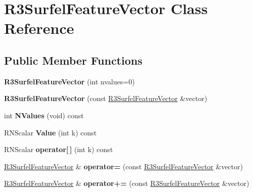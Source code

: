\hypertarget{class_r3_surfel_feature_vector}{}\section{R3\+Surfel\+Feature\+Vector Class Reference}
\label{class_r3_surfel_feature_vector}
\subsection*{Public Member Functions}
\begin{DoxyCompactItemize}
\item 
{\bfseries R3\+Surfel\+Feature\+Vector} (int nvalues=0)\hypertarget{class_r3_surfel_feature_vector_aee3b6c306e9c9bbbb0ce590dffea5a0a}{}\label{class_r3_surfel_feature_vector_aee3b6c306e9c9bbbb0ce590dffea5a0a}

\item 
{\bfseries R3\+Surfel\+Feature\+Vector} (const \hyperlink{class_r3_surfel_feature_vector}{R3\+Surfel\+Feature\+Vector} \&vector)\hypertarget{class_r3_surfel_feature_vector_a18ea0c4805eafdf629959736dc810789}{}\label{class_r3_surfel_feature_vector_a18ea0c4805eafdf629959736dc810789}

\item 
int {\bfseries N\+Values} (void) const \hypertarget{class_r3_surfel_feature_vector_a790ba6798718202f0a2ef0420c05708f}{}\label{class_r3_surfel_feature_vector_a790ba6798718202f0a2ef0420c05708f}

\item 
R\+N\+Scalar {\bfseries Value} (int k) const \hypertarget{class_r3_surfel_feature_vector_ad369ddb0340023a479f69a82266b9f01}{}\label{class_r3_surfel_feature_vector_ad369ddb0340023a479f69a82266b9f01}

\item 
R\+N\+Scalar {\bfseries operator\mbox{[}$\,$\mbox{]}} (int k) const \hypertarget{class_r3_surfel_feature_vector_afeca7dc25cbfa427483b28cba537bc25}{}\label{class_r3_surfel_feature_vector_afeca7dc25cbfa427483b28cba537bc25}

\item 
\hyperlink{class_r3_surfel_feature_vector}{R3\+Surfel\+Feature\+Vector} \& {\bfseries operator=} (const \hyperlink{class_r3_surfel_feature_vector}{R3\+Surfel\+Feature\+Vector} \&vector)\hypertarget{class_r3_surfel_feature_vector_a747f16ad4203e39deaf6149a2f2a6843}{}\label{class_r3_surfel_feature_vector_a747f16ad4203e39deaf6149a2f2a6843}

\item 
\hyperlink{class_r3_surfel_feature_vector}{R3\+Surfel\+Feature\+Vector} \& {\bfseries operator+=} (const \hyperlink{class_r3_surfel_feature_vector}{R3\+Surfel\+Feature\+Vector} \&vector)\hypertarget{class_r3_surfel_feature_vector_ab3ec3751f83f911e6c1c22b317e3e760}{}\label{class_r3_surfel_feature_vector_ab3ec3751f83f911e6c1c22b317e3e760}


\end{DoxyCompactItemize}
